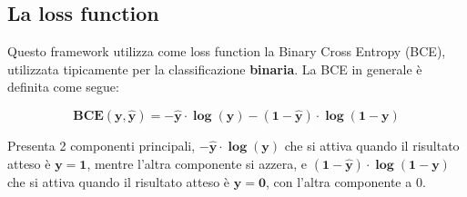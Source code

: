 \subsection{La loss function}
Questo framework utilizza come loss function la Binary Cross Entropy (BCE), utilizzata tipicamente per la classificazione \textbf{binaria}. 
La BCE in generale è definita come segue:

\begin{equation}
    \mathbf{BCE(y, \hat{y}) = -\hat{y} \cdot \log(y) - (1-\hat{y}) \cdot \log(1-y)}
\end{equation}

Presenta 2 componenti principali, $\mathbf{-\hat{y} \cdot \log(y)}$ che si attiva quando il risultato atteso è $\mathbf{y = 1}$, mentre l'altra componente si azzera,
e $\mathbf{(1-\hat{y}) \cdot \log(1-y)}$ che si attiva quando il risultato atteso è $\mathbf{y = 0}$, con l'altra componente a 0.

